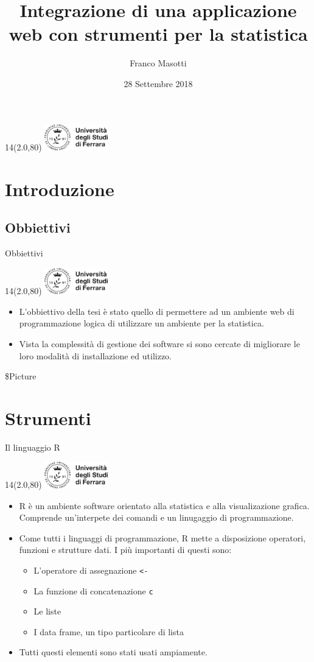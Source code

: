 \documentclass[11pt,xcolor={dvipsnames},default]{beamer} %
\title[Integrazione applicazione web]{Integrazione di una applicazione web con strumenti per la statistica}
\author[Franco Masotti]
{Franco Masotti}
\institute[Institute Name]
{
  Università degli studi di Ferrara \\
  Dipartimento di Matematica e Informatica \\[0.5Cm]
  Relatore\\ Prof. \textbf{Fabrizio Riguzzi}\\[0.25Cm]
  }
\date{28 Settembre 2018}
\newcommand{\MyLogo}{%
\begin{textblock}{14}(2.0,80)
 \includegraphics[height=1.15cm, angle=0]{logo}
\end{textblock}
}
\begin{document}

\begin{frame}
\transdissolve
\MyLogo
\begin{center}
  \titlepage
\end{center}
\end{frame}



\section{Introduzione}
\subsection{Obbiettivi}
\begin{frame}{Obbiettivi}
\transboxin
\MyLogo
\begin{itemize}
\item L'obbiettivo della tesi è stato quello di permettere ad un ambiente web
di programmazione logica di utilizzare un ambiente per la statistica.
\item Vista la complessità di gestione dei software si sono cercate di 
migliorare le loro modalità di installazione ed utilizzo.
\end{itemize}
\$Picture
\end{frame}

\section{Strumenti}
\begin{frame}{Il linguaggio R}
\transboxin
\MyLogo
\begin{itemize}
\item R è un ambiente software orientato alla statistica e alla visualizazione 
grafica. Comprende un'interpete dei comandi e un linugaggio di programmazione.
\item Come tutti i linguaggi di programmazione, R mette a disposizione 
operatori, funzioni e strutture dati. I più importanti di questi sono:
\begin{itemize}
\item L'operatore di assegnazione \texttt{<-}
\item La funzione di concatenazione \texttt{c}
\item Le liste
\item I data frame, un tipo particolare di lista
\end{itemize}
\item Tutti questi elementi sono stati usati ampiamente.
\end{itemize}
\end{frame}
\end{document}
